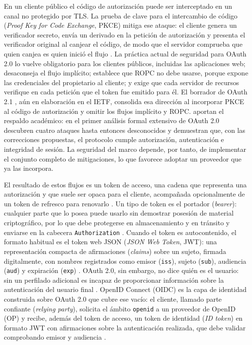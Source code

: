 En un cliente público el código de autorización puede ser interceptado en un canal no protegido por TLS\@. La prueba de clave para el intercambio de código (\textit{Proof Key for Code Exchange}, PKCE) mitiga ese ataque: el cliente genera un verificador secreto, envía un derivado en la petición de autorización y presenta el verificador original al canjear el código, de modo que el servidor comprueba que quien canjea es quien inició el flujo \parencite{RFC7636}. La práctica actual de seguridad para OAuth 2.0 \parencite{RFC9700} lo vuelve obligatorio para los clientes públicos, incluidas las aplicaciones web; desaconseja el flujo implícito; establece que ROPC no debe usarse, porque expone las credenciales del propietario al cliente; y exige que cada servidor de recursos verifique en cada petición que el token fue emitido para él. El borrador de OAuth 2.1 \parencite{OAuth21Draft}, aún en elaboración en el IETF, consolida esa dirección al incorporar PKCE al código de autorización y omitir los flujos implícito y ROPC\@. \textcite{Fett2016} aportan el respaldo académico: en el primer análisis formal extensivo de OAuth 2.0 descubren cuatro ataques hasta entonces desconocidos y demuestran que, con las correcciones propuestas, el protocolo cumple autorización, autenticación e integridad de sesión. La seguridad del marco depende, por tanto, de implementar el conjunto completo de mitigaciones, lo que favorece adoptar un proveedor que ya las incorpora.

El resultado de estos flujos es un token de acceso, una cadena que representa una autorización y que suele ser opaca para el cliente, acompañada opcionalmente de un token de refresco para renovarlo \parencite{RFC6749}. Un tipo de token es el portador (\textit{bearer}): cualquier parte que lo posea puede usarlo sin demostrar posesión de material criptográfico, por lo que debe protegerse en almacenamiento y en tránsito y enviarse en la cabecera \texttt{Authorization} \parencite{RFC6750}. Cuando el token es autocontenido, el formato habitual es el token web JSON (\textit{JSON Web Token}, JWT): una representación compacta de afirmaciones (\textit{claims}) sobre un sujeto, firmada digitalmente, con nombres registrados como emisor (\texttt{iss}), sujeto (\texttt{sub}), audiencia (\texttt{aud}) y expiración (\texttt{exp}) \parencite{RFC7519}. OAuth 2.0, sin embargo, no dice quién es el usuario: sin un perfilado adicional es incapaz de proporcionar información sobre la autenticación del usuario final \parencite{OIDCCore2014}. OpenID Connect (OIDC) es la capa de identidad construida sobre OAuth 2.0 que cubre ese vacío: el cliente, llamado parte confiante (\textit{relying party}), solicita el ámbito \texttt{openid} a un proveedor de OpenID (OP) y recibe, además del token de acceso, un token de identidad (\textit{ID token}) en formato JWT con afirmaciones sobre la autenticación realizada, que debe validar comprobando emisor y audiencia \parencite{OIDCCore2014}.

